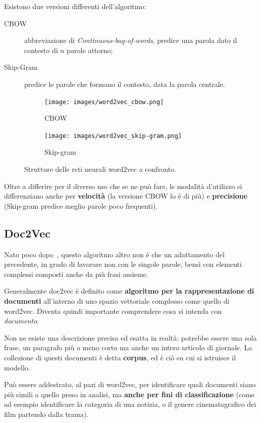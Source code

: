 \documentclass[12pt,a4paper,twoside,openright]{book}
\begin{document}
Esistono due versioni differenti dell'algoritmo:
\begin{description}
    \item [CBOW] abbreviazione di \emph{Continuous-bag-of-words}, predice una parola dato il contesto di $n$ parole attorno;
    \item [Skip-Gram] predice le parole che formano il contesto, data la parola centrale.
\end{description}
\begin{figure}[H]
    \centering
    \begin{subfigure}[b]{0.48\textwidth}
        \texttt{[image: images/word2vec\_cbow.png]}
        \caption{CBOW}
    \end{subfigure}
    \quad
    \begin{subfigure}[b]{0.48\textwidth}
        \texttt{[image: images/word2vec\_skip-gram.png]}
        \caption{Skip-gram}
    \end{subfigure}
    \caption{Strutture delle reti neurali word2vec a confronto.}
    \label{fig:neural_word2vec}
\end{figure}
Oltre a differire per il diverso uso che se ne può fare, le modalità d'utilizzo si differenziano anche per \textbf{velocità} (la versione CBOW lo è di più) e \textbf{precisione} (Skip-gram predice meglio parole poco frequenti).


\subsection{Doc2Vec}

Nato poco dopo~\cite{DBLP:conf/icml/LeM14}, questo algoritmo altro non è che un adattamento del precedente, in grado di lavorare non con le singole parole, bensì con elementi complessi composti anche da più frasi assieme.

Generalmente doc2vec è definito come \textbf{algoritmo per la rappresentazione di documenti} all'interno di uno spazio vettoriale complesso come quello di word2vec. Diventa quindi importante comprendere cosa si intenda con \emph{documento}.

Non ne esiste una descrizione precisa ed esatta in realtà: potrebbe essere una sola frase, un paragrafo più o meno corto ma anche un intero articolo di giornale. La collezione di questi documenti è detta \textbf{corpus}, ed è ciò su cui si istruisce il modello.

Può essere addestrato, al pari di word2vec, per identificare quali documenti siano più simili a quello preso in analisi, ma \textbf{anche per fini di classificazione} (come ad esempio identificare la categoria di una notizia, o il genere cinematografico dei film partendo dalla trama).
\end{document}
